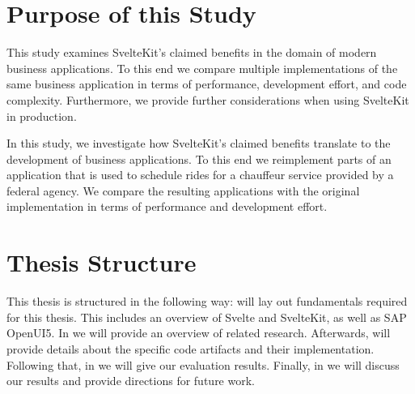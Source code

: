 \section{Purpose of this Study}
\label{sec:purpose-of-this-study}
This study examines SvelteKit's claimed benefits in the domain of modern business applications. To this end we compare multiple implementations of the same business application in terms of performance, development effort, and code complexity. Furthermore, we provide further considerations when using SvelteKit in production.

In this study, we investigate how SvelteKit's claimed benefits translate to the development of business applications. To this end we reimplement parts of an application that is used to schedule rides for a chauffeur service provided by a federal agency. We compare the resulting applications with the original implementation in terms of performance and development effort. 


\pagebreak

\section{Thesis Structure}
This thesis is structured in the following way:  will lay out fundamentals required for this thesis. This includes an overview of Svelte and SvelteKit, as well as SAP OpenUI5. In  we will provide an overview of related research. Afterwards,  will provide details about the specific code artifacts and their implementation. Following that, in  we will give our evaluation results. Finally, in  we will discuss our results and provide directions for future work.

